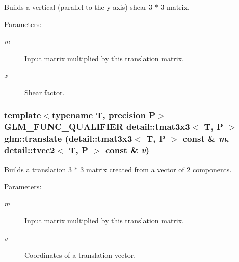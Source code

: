 Builds a vertical (parallel to the y axis) shear 3 $\ast$ 3 matrix.

\begin{Desc}
\item[Parameters:]
\begin{description}
\item[{\em m}]Input matrix multiplied by this translation matrix. \item[{\em x}]Shear factor. \end{description}
\end{Desc}
\hypertarget{group__gtx__matrix__transform__2d_g307934204fead7ff8ec86bd4499c0adc}{
\subsubsection[translate]{\setlength{\rightskip}{0pt plus 5cm}template$<$typename T, precision P$>$ GLM\_\-FUNC\_\-QUALIFIER detail::tmat3x3$<$ T, P $>$ glm::translate (detail::tmat3x3$<$ T, P $>$ const \& {\em m}, \/  detail::tvec2$<$ T, P $>$ const \& {\em v})}}
\label{group__gtx__matrix__transform__2d_g307934204fead7ff8ec86bd4499c0adc}


Builds a translation 3 $\ast$ 3 matrix created from a vector of 2 components.

\begin{Desc}
\item[Parameters:]
\begin{description}
\item[{\em m}]Input matrix multiplied by this translation matrix. \item[{\em v}]Coordinates of a translation vector. \end{description}
\end{Desc}
